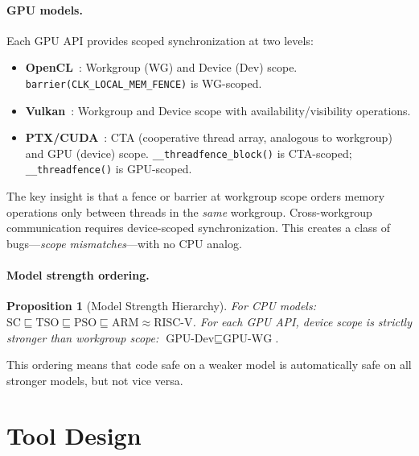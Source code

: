 \documentclass[10pt]{article}
\newtheorem{proposition}[theorem]{Proposition}
\begin{document}
\paragraph{GPU models.}
Each GPU API provides scoped synchronization at two levels:
\begin{itemize}[nosep]
\item \textbf{OpenCL}~\cite{Sorensen2016}: Workgroup (WG) and Device
      (Dev) scope. \texttt{barrier(CLK\_LOCAL\_MEM\_FENCE)} is WG-scoped.
\item \textbf{Vulkan}~\cite{KhronosVulkan}: Workgroup and Device scope
      with availability/visibility operations.
\item \textbf{PTX/CUDA}~\cite{Lustig2019}: CTA (cooperative thread
      array, analogous to workgroup) and GPU (device) scope.
      \texttt{\_\_threadfence\_block()} is CTA-scoped;
      \texttt{\_\_threadfence()} is GPU-scoped.
\end{itemize}

The key insight is that a fence or barrier at workgroup scope orders
memory operations only between threads in the \emph{same} workgroup.
Cross-workgroup communication requires device-scoped synchronization.
This creates a class of bugs---\emph{scope mismatches}---with no CPU
analog.

\paragraph{Model strength ordering.}

\begin{proposition}[Model Strength Hierarchy]
\label{prop:strength}
For CPU models:
$\text{SC} \sqsubseteq \text{TSO} \sqsubseteq \text{PSO} \sqsubseteq \text{ARM} \approx \text{RISC-V}$.
For each GPU API, device scope is strictly stronger than workgroup scope:
$\text{GPU-Dev} \sqsubseteq \text{GPU-WG}$.
\end{proposition}

\noindent This ordering means that code safe on a weaker model is
automatically safe on all stronger models, but not vice versa.

\section{Tool Design}
\label{sec:design}
\end{document}
